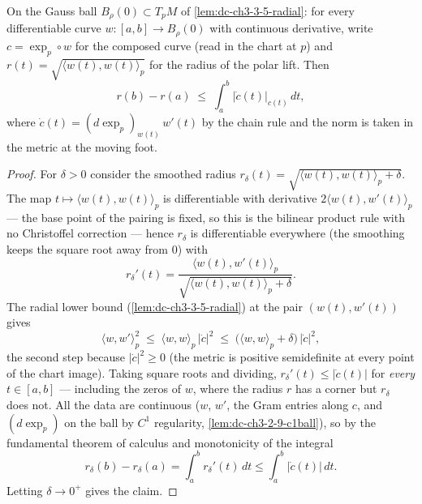 \begin{lemma}
  \label{lem:dc-ch3-3-6-radius}
  \leanok
  On the Gauss ball $B_\rho(0)\subset T_pM$ of \cref{lem:dc-ch3-3-5-radial}: for
  every differentiable curve $w:[a,b]\to B_\rho(0)$ with continuous derivative,
  write $c=\exp_p\circ w$ for the composed curve (read in the chart at $p$) and
  $r(t)=\sqrt{\langle w(t),w(t)\rangle_p}$ for the radius of the polar lift.
  Then
  $$r(b)-r(a)\;\le\;\int_a^b\big|\dot c(t)\big|_{c(t)}\,dt,$$
  where $\dot c(t)=(d\exp_p)_{w(t)}\,w'(t)$ by the chain rule and the norm is
  taken in the metric at the moving foot.
\end{lemma}
\begin{proof}
  \sketch
  \leanok
  For $\delta>0$ consider the smoothed radius
  $r_\delta(t)=\sqrt{\langle w(t),w(t)\rangle_p+\delta}$. The map
  $t\mapsto\langle w(t),w(t)\rangle_p$ is differentiable with derivative
  $2\langle w(t),w'(t)\rangle_p$ — the base point of the pairing is fixed, so
  this is the bilinear product rule with no Christoffel correction — hence
  $r_\delta$ is differentiable everywhere (the smoothing keeps the square root
  away from $0$) with
  $$r_\delta'(t)=\frac{\langle w(t),w'(t)\rangle_p}
    {\sqrt{\langle w(t),w(t)\rangle_p+\delta}}.$$
  The radial lower bound (\cref{lem:dc-ch3-3-5-radial}) at the pair
  $(w(t),w'(t))$ gives
  $$\langle w,w'\rangle_p^2\;\le\;\langle w,w\rangle_p\,\big|\dot c\big|^2
    \;\le\;\big(\langle w,w\rangle_p+\delta\big)\,\big|\dot c\big|^2,$$
  the second step because $|\dot c|^2\ge 0$ (the metric is positive
  semidefinite at every point of the chart image). Taking square roots and
  dividing, $r_\delta'(t)\le|\dot c(t)|$ for \emph{every} $t\in[a,b]$ —
  including the zeros of $w$, where the radius $r$ has a corner but
  $r_\delta$ does not. All the data are continuous ($w$, $w'$, the Gram
  entries along $c$, and $(d\exp_p)$ on the ball by $C^1$ regularity,
  \cref{lem:dc-ch3-2-9-c1ball}), so by the fundamental theorem of calculus
  and monotonicity of the integral
  $$r_\delta(b)-r_\delta(a)=\int_a^b r_\delta'(t)\,dt
    \le\int_a^b\big|\dot c(t)\big|\,dt.$$
  Letting $\delta\to0^+$ gives the claim.
\end{proof}

